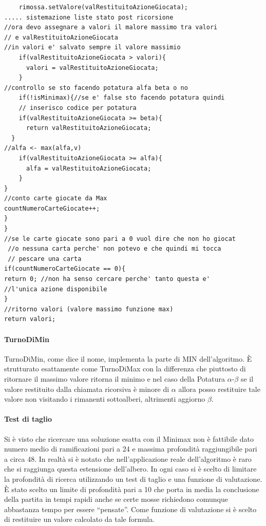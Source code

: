 \begin{lstlisting}
    rimossa.setValore(valRestituitoAzioneGiocata);
..... sistemazione liste stato post ricorsione
//ora devo assegnare a valori il malore massimo tra valori
// e valRestituitoAzioneGiocata
//in valori e' salvato sempre il valore massimio
    if(valRestituitoAzioneGiocata > valori){
      valori = valRestituitoAzioneGiocata;
    }
//controllo se sto facendo potatura alfa beta o no
    if(!isMinimax){//se e' false sto facendo potatura quindi
    // inserisco codice per potatura
    if(valRestituitoAzioneGiocata >= beta){
      return valRestituitoAzioneGiocata;
  }
//alfa <- max(alfa,v)
    if(valRestituitoAzioneGiocata >= alfa){
      alfa = valRestituitoAzioneGiocata;
    }
}
//conto carte giocate da Max
countNumeroCarteGiocate++;
}
}
//se le carte giocate sono pari a 0 vuol dire che non ho giocat
 //o nessuna carta perche' non potevo e che quindi mi tocca
 // pescare una carta
if(countNumeroCarteGiocate == 0){
return 0; //non ha senso cercare perche' tanto questa e' 
//l'unica azione disponibile
}
//ritorno valori (valore massimo funzione max)
return valori;	
\end{lstlisting}
	
		\paragraph{TurnoDiMin}
		TurnoDiMin, come dice il nome, implementa la parte di MIN dell'algoritmo. È strutturato esattamente come TurnoDiMax con la differenza che piuttosto di ritornare il massimo valore ritorna il minimo e nel caso della Potatura $\alpha$-$\beta$ se il valore restituito dalla chiamata ricorsiva è minore di $\alpha$ allora posso restituire tale valore non visitando i rimanenti sottoalberi, altrimenti aggiorno $\beta$.
		
		\paragraph{Test di taglio}
		Si è visto che ricercare una soluzione esatta con il Minimax non è fattibile dato numero medio di ramificazioni pari a 24 e massima profondità raggiungibile pari a circa 48. In realtà si è notato che nell'applicazione reale dell'algoritmo è raro che si raggiunga questa estensione dell'albero. In ogni caso si è scelto di limitare la profondità di ricerca utilizzando un test di taglio e una funzione di valutazione. È stato scelto un limite di profondità pari a 10 che porta in media la conclusione della partita in tempi rapidi anche se certe mosse richiedono comunque abbastanza tempo per essere ``pensate''. Come funzione di valutazione si è scelto di restituire un valore calcolato da tale formula.\\\\
		
